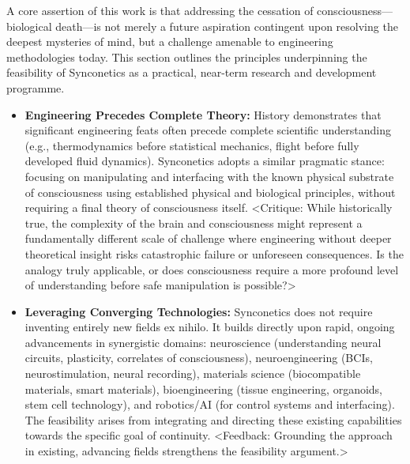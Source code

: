 \documentclass[10pt]{article}
\begin{document}
\begin{sloppypar}
  A core assertion of this work is that addressing the cessation of consciousness—biological death—is not merely a future aspiration contingent upon resolving the deepest mysteries of mind, but a challenge amenable to engineering methodologies today. This section outlines the principles underpinning the feasibility of Synconetics as a practical, near-term research and development programme.

  \begin{itemize}
    \item \textbf{Engineering Precedes Complete Theory:} History demonstrates that significant engineering feats often precede complete scientific understanding (e.g., thermodynamics before statistical mechanics, flight before fully developed fluid dynamics). Synconetics adopts a similar pragmatic stance: focusing on manipulating and interfacing with the known physical substrate of consciousness using established physical and biological principles, without requiring a final theory of consciousness itself. <Critique: While historically true, the complexity of the brain and consciousness might represent a fundamentally different scale of challenge where engineering without deeper theoretical insight risks catastrophic failure or unforeseen consequences. Is the analogy truly applicable, or does consciousness require a more profound level of understanding before safe manipulation is possible?>

    \item \textbf{Leveraging Converging Technologies:} Synconetics does not require inventing entirely new fields ex nihilo. It builds directly upon rapid, ongoing advancements in synergistic domains: neuroscience (understanding neural circuits, plasticity, correlates of consciousness), neuroengineering (BCIs, neurostimulation, neural recording), materials science (biocompatible materials, smart materials), bioengineering (tissue engineering, organoids, stem cell technology), and robotics/AI (for control systems and interfacing). The feasibility arises from integrating and directing these existing capabilities towards the specific goal of continuity. <Feedback: Grounding the approach in existing, advancing fields strengthens the feasibility argument.>


\end{itemize}
\end{sloppypar}
\end{document}
